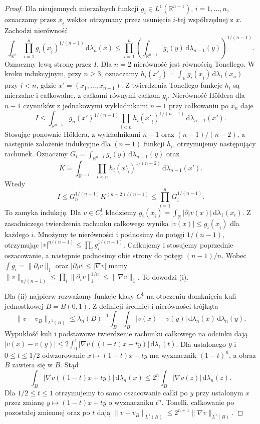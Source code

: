 \begin{proof}
Dla nieujemnych mierzalnych funkcji
$g_i\in L^1(\mathbb R^{n-1})$, $i=1,\ldots,n$,
oznaczamy przez $x_{\widehat i}$ wektor otrzymany
przez usunięcie $i$-tej współrzędnej z $x$.
Zachodzi nierówność
\[
 \int_{\mathbb R^n}\prod_{i=1}^n
 g_i(x_{\widehat i})^{1/(n-1)}\,\mathrm d\lambda_n(x)
 \le\prod_{i=1}^n
 \left(\int_{\mathbb R^{n-1}}g_i(y)\,
 \mathrm d\lambda_{n-1}(y)\right)^{1/(n-1)}.
\]
Oznaczmy lewą stronę przez $I$.
Dla $n=2$ nierówność jest równością Tonellego.
W kroku indukcyjnym, przy $n\ge3$, oznaczamy
$h_i(x'_{\widehat i})=\int_{\mathbb R}
 g_i(x_{\widehat i})\,\mathrm d\lambda_1(x_n)$
przy $i<n$, gdzie $x'=(x_1,\ldots,x_{n-1})$.
Z twierdzenia Tonellego funkcje $h_i$ są mierzalne
i całkowalne, z całkami równymi całkom $g_i$.
Nierówność Höldera dla $n-1$ czynników z jednakowymi
wykładnikami $n-1$ przy całkowaniu po $x_n$ daje
\[
 I\le\int_{\mathbb R^{n-1}}g_n(x')^{1/(n-1)}
 \prod_{i<n}h_i(x'_{\widehat i})^{1/(n-1)}
 \,\mathrm d\lambda_{n-1}(x').
\]
Stosując ponownie Höldera, z wykładnikami
$n-1$ oraz $(n-1)/(n-2)$, a następnie
założenie indukcyjne dla $(n-1)$ funkcji $h_i$,
otrzymujemy następujący rachunek. Oznaczmy
$G_i=\int_{\mathbb R^{n-1}}g_i(y)\,
\mathrm d\lambda_{n-1}(y)$ oraz
\[
 K=\int_{\mathbb R^{n-1}}\prod_{i<n}
 h_i(x'_{\widehat i})^{1/(n-2)}
 \,\mathrm d\lambda_{n-1}(x').
\]
Wtedy
\[
 I\le G_n^{1/(n-1)}K^{(n-2)/(n-1)}
 \le\prod_{i=1}^n G_i^{1/(n-1)}.
\]
To zamyka indukcję.
Dla $v\in C_c^1$ kładziemy
$g_i(x_{\widehat i})=\int_{\mathbb R}
|\partial_i v(x)|\,\mathrm d\lambda_1(x_i)$.
Z zasadniczego twierdzenia rachunku całkowego wynika
$|v(x)|\le g_i(x_{\widehat i})$ dla każdego $i$.
Mnożymy te nierówności i podnosimy do potęgi
$1/(n-1)$, otrzymując
$|v|^{n/(n-1)}\le\prod_i g_i^{1/(n-1)}$.
Całkujemy i stosujemy poprzednie oszacowanie,
a następnie podnosimy obie strony do potęgi
$(n-1)/n$. Wobec $\int g_i=\|\partial_i v\|_1$
oraz $|\partial_i v|\le|\nabla v|$ mamy
$\|v\|_{n/(n-1)}\le\prod_i\|\partial_i v\|_1^{1/n}
\le\|\nabla v\|_1$. To dowodzi (i).

Dla (ii) najpierw rozważamy funkcje klasy $C^1$
na otoczeniu domknięcia kuli jednostkowej $B=B(0,1)$.
Z definicji średniej i nierówności trójkąta
\[
 \|v-v_B\|_{L^1(B)}
 \le\lambda_n(B)^{-1}\int_B\int_B|v(x)-v(y)|
 \,\mathrm d\lambda_n(x)\,\mathrm d\lambda_n(y).
\]
Wypukłość kuli i podstawowe twierdzenie rachunku
całkowego na odcinku dają
$|v(x)-v(y)|\le2\int_0^1
|\nabla v((1-t)x+ty)|\,\mathrm d\lambda_1(t)$.
Dla ustalonego $y$ i $0\le t\le1/2$ odwzorowanie
$x\mapsto(1-t)x+ty$ ma wyznacznik $(1-t)^n$,
a obraz $B$ zawiera się w $B$. Stąd
\[
 \int_B|\nabla v((1-t)x+ty)|\,\mathrm d\lambda_n(x)
 \le2^n\int_B|\nabla v(z)|\,\mathrm d\lambda_n(z).
\]
Dla $1/2\le t\le1$ otrzymujemy to samo oszacowanie
całki po $y$ przy ustalonym $x$ przez zmianę
$y\mapsto(1-t)x+ty$ o wyznaczniku $t^n$.
Tonelli, całkowanie po pozostałej zmiennej oraz
po $t$ dają
$\|v-v_B\|_{L^1(B)}\le2^{n+1}\|\nabla v\|_{L^1(B)}$.


\end{proof}
